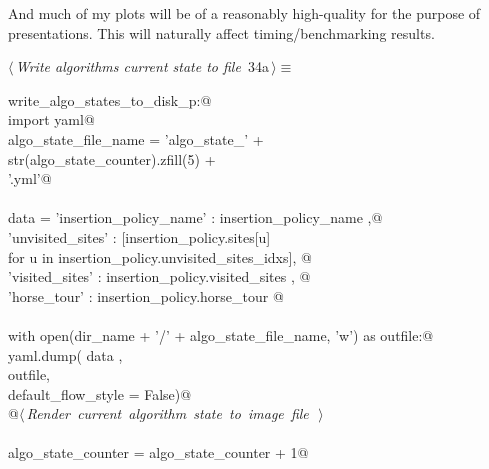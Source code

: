 \documentclass[11.5pt]{report}
\begin{document}
And much of my plots will be of a reasonably high-quality for the purpose of presentations. This will naturally 
affect timing/benchmarking results. 

\begin{flushleft} \small\label{scrap37}\raggedright\small
{} $\langle\,${\itshape Write algorithms current state to file}\nobreak\ {\footnotesize {34a}}$\,\rangle\equiv$
\vspace{-1ex}
\begin{list}{}{} \item
\mbox{}\verb@if write_algo_states_to_disk_p:@\\
\mbox{}\verb@     import yaml@\\
\mbox{}\verb@     algo_state_file_name = 'algo_state_'                    + \@\\
\mbox{}\verb@                       str(algo_state_counter).zfill(5) + \@\\
\mbox{}\verb@                       '.yml'@\\
\mbox{}\verb@@\\
\mbox{}\verb@     data = {'insertion_policy_name' : insertion_policy_name                       ,@\\
\mbox{}\verb@             'unvisited_sites'       : [insertion_policy.sites[u] \@\\
\mbox{}\verb@                                            for u in insertion_policy.unvisited_sites_idxs], @\\
\mbox{}\verb@             'visited_sites'         : insertion_policy.visited_sites                    , @\\
\mbox{}\verb@             'horse_tour'            : insertion_policy.horse_tour }@\\
\mbox{}\verb@@\\
\mbox{}\verb@     with open(dir_name + '/' + algo_state_file_name, 'w') as outfile:@\\
\mbox{}\verb@          yaml.dump( data   , \@\\
\mbox{}\verb@                     outfile, \@\\
\mbox{}\verb@                     default_flow_style = False)@\\
\mbox{}\verb@          @\hbox{$\langle\,${\itshape Render current algorithm state to image file}\nobreak\ {\footnotesize {}}$\,\rangle$}\verb@@\\
\mbox{}\verb@@\\
\mbox{}\verb@     algo_state_counter = algo_state_counter + 1@\\

\end{list}
\end{flushleft}
\end{document}

